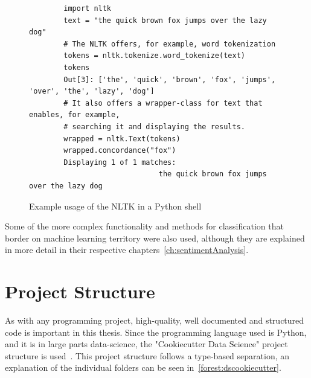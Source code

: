 \begin{figure}
    \caption{Example usage of the NLTK in a Python shell}
    \label{code:nltk}
    \begin{verbatim}
        import nltk
        text = "the quick brown fox jumps over the lazy dog"
        # The NLTK offers, for example, word tokenization
        tokens = nltk.tokenize.word_tokenize(text)
        tokens
        Out[3]: ['the', 'quick', 'brown', 'fox', 'jumps', 'over', 'the', 'lazy', 'dog']
        # It also offers a wrapper-class for text that enables, for example,
        # searching it and displaying the results.
        wrapped = nltk.Text(tokens)
        wrapped.concordance("fox")
        Displaying 1 of 1 matches:
                              the quick brown fox jumps over the lazy dog
    \end{verbatim}
\end{figure}

Some of the more complex functionality and methods for classification that border on machine learning territory were also used,
although they are explained in more detail in their respective chapters~\autoref{ch:sentimentAnalysis}.

\section{Project Structure}
\label{sec:projectStructure}

As with any programming project, high-quality, well documented and structured code is important in this thesis.
Since the programming language used is Python, and it is in large parts data-science,
the "Cookiecutter Data Science" project structure is used~\cite{dsCookieCutter}.
This project structure follows a type-based separation, an explanation of the individual folders can be seen in~\autoref{forest:dscookiecutter}.

